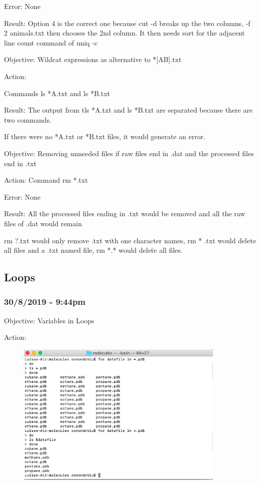 \documentclass{article}
\begin{document}
Error: None

Result: Option 4 is the correct one because cut -d breaks up the two columns, -f 2 animals.txt then chooses the 2nd column. It then needs sort for the adjacent line count command of uniq -c

Objective: Wildcat expressions as alternative to  *[AB].txt

Action:

Commands ls *A.txt and ls *B.txt  

Result: The output from tls *A.txt and ls *B.txt are separated because there are two commands.

If there were no *A.txt or *B.txt files, it would generate an error.

Objective: Removing unneeded files if raw files end in .dat and the processed files end in .txt

Action: Command rm *.txt

Error: None

Result: All the processed files ending in .txt would be removed and all the raw files of .dat would remain

rm ?.txt would only remove .txt with one character names, rm * .txt would delete all files and a .txt named file, rm *.* would delete all files.


\subsection{Loops}
\subsubsection*{30/8/2019 - 9:44pm}

Objective: Variables in Loops

Action:\par
\begin{figure}[htp]
    \centering
    \includegraphics[width=10cm]{Screenshot14.png}
    \label{fig:ls-14}
\end{figure}
\end{document}

